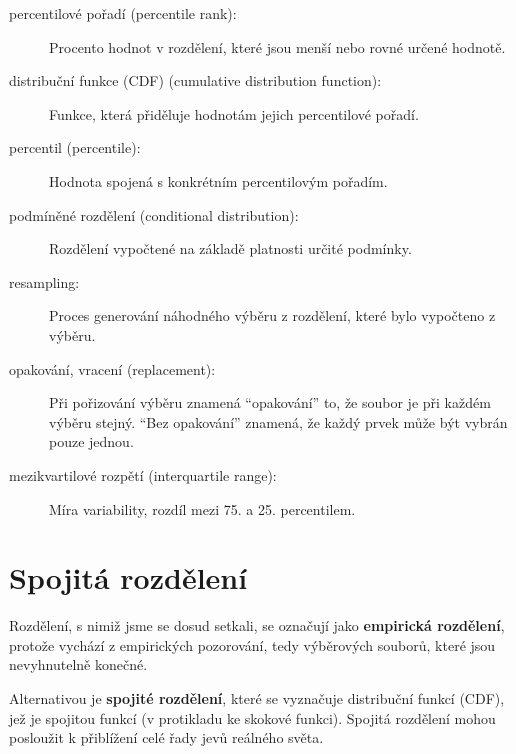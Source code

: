 \documentclass[12pt]{book}
\begin{document}
\begin{description}

\item[percentilové pořadí (percentile rank):] Procento hodnot v rozdělení, které jsou menší nebo rovné určené hodnotě.

\item[distribuční funkce (CDF) (cumulative distribution function):] Funkce, která přiděluje hodnotám jejich percentilové pořadí.

\item[percentil (percentile):] Hodnota spojená s konkrétním percentilovým pořadím.

\item[podmíněné rozdělení (conditional distribution):] Rozdělení vypočtené na základě platnosti určité podmínky.  

\item[resampling:] Proces generování náhodného výběru z rozdělení, které bylo vypočteno z výběru.

\item[opakování, vracení (replacement):] Při pořizování výběru znamená ``opakování'' to, že soubor je při každém výběru stejný. ``Bez opakování'' znamená, že každý prvek může být vybrán pouze jednou.

\item[mezikvartilové rozpětí (interquartile range):] Míra variability, rozdíl mezi 75. a 25. percentilem.

\end{description}



\chapter{Spojitá rozdělení}
\label{continuous}

Rozdělení, s nimiž jsme se dosud setkali, se označují jako {\bf
  empirická rozdělení}, protože vychází z empirických pozorování, tedy výběrových souborů, které jsou nevyhnutelně konečné.

Alternativou je {\bf spojité rozdělení}, které se vyznačuje distribuční funkcí (CDF), jež je spojitou funkcí (v protikladu ke skokové funkci). Spojitá rozdělení mohou posloužit k přiblížení celé řady jevů reálného světa.
\end{document}
